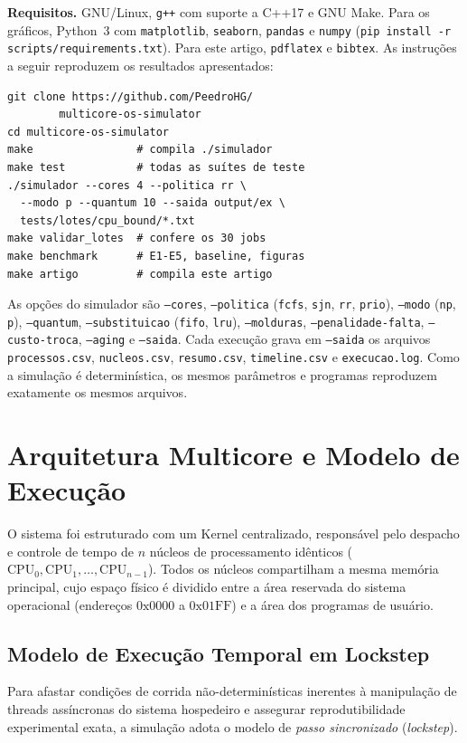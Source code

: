 \documentclass[conference]{IEEEtran}
\begin{document}
\textbf{Requisitos.} GNU/Linux, \texttt{g++} com suporte a C++17 e GNU Make. Para os gráficos, Python~3 com \texttt{matplotlib}, \texttt{seaborn}, \texttt{pandas} e \texttt{numpy} (\texttt{pip install -r scripts/requirements.txt}). Para este artigo, \texttt{pdflatex} e \texttt{bibtex}. As instruções a seguir reproduzem os resultados apresentados:
\begin{footnotesize}
\begin{verbatim}
git clone https://github.com/PeedroHG/
        multicore-os-simulator
cd multicore-os-simulator
make                # compila ./simulador
make test           # todas as suítes de teste
./simulador --cores 4 --politica rr \
  --modo p --quantum 10 --saida output/ex \
  tests/lotes/cpu_bound/*.txt
make validar_lotes  # confere os 30 jobs
make benchmark      # E1-E5, baseline, figuras
make artigo         # compila este artigo
\end{verbatim}
\end{footnotesize}
As opções do simulador são \texttt{--cores}, \texttt{--politica} (\texttt{fcfs}, \texttt{sjn}, \texttt{rr}, \texttt{prio}), \texttt{--modo} (\texttt{np}, \texttt{p}), \texttt{--quantum}, \texttt{--substituicao} (\texttt{fifo}, \texttt{lru}), \texttt{--molduras}, \texttt{--penalidade-falta}, \texttt{--custo-troca}, \texttt{--aging} e \texttt{--saida}. Cada execução grava em \texttt{--saida} os arquivos \texttt{processos.csv}, \texttt{nucleos.csv}, \texttt{resumo.csv}, \texttt{timeline.csv} e \texttt{execucao.log}. Como a simulação é determinística, os mesmos parâmetros e programas reproduzem exatamente os mesmos arquivos.

\section{Arquitetura Multicore e Modelo de Execução}
\label{sec:arq}
O sistema foi estruturado com um Kernel centralizado, responsável pelo despacho e controle de tempo de $n$ núcleos de processamento idênticos ($\text{CPU}_0, \text{CPU}_1, \dots, \text{CPU}_{n-1}$). Todos os núcleos compartilham a mesma memória principal, cujo espaço físico é dividido entre a área reservada do sistema operacional (endereços $0\text{x}0000$ a $0\text{x}01\text{FF}$) e a área dos programas de usuário.

\subsection{Modelo de Execução Temporal em Lockstep}
Para afastar condições de corrida não-determinísticas inerentes à manipulação de threads assíncronas do sistema hospedeiro e assegurar reprodutibilidade experimental exata, a simulação adota o modelo de \textit{passo sincronizado} (\textit{lockstep}). 
\end{document}
